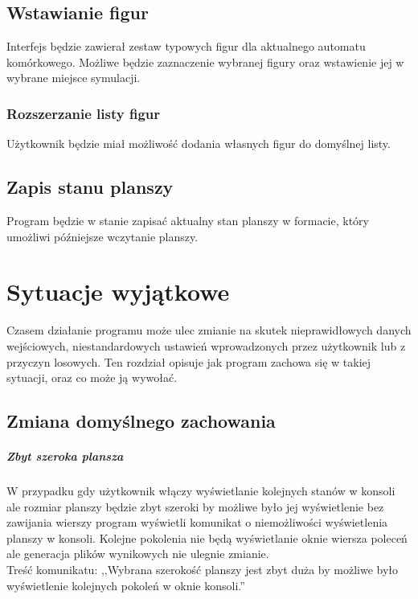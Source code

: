 \documentclass{report}
\begin{document}
\section{Wstawianie figur}
Interfejs będzie zawierał zestaw typowych figur dla aktualnego automatu komórkowego. Możliwe będzie zaznaczenie wybranej figury oraz wstawienie jej w wybrane miejsce symulacji.

\subsection{Rozszerzanie listy figur}
Użytkownik będzie miał możliwość dodania własnych figur do domyślnej listy.

\section{Zapis stanu planszy}
Program będzie w stanie zapisać aktualny stan planszy w formacie, który umożliwi późniejsze  wczytanie planszy.

\chapter{Sytuacje wyjątkowe}
Czasem działanie programu może ulec zmianie na skutek nieprawidłowych danych wejściowych, niestandardowych ustawień wprowadzonych przez użytkownik lub z przyczyn losowych. Ten rozdział opisuje jak program zachowa się w takiej sytuacji, oraz co może ją wywołać.

\section{Zmiana domyślnego zachowania}
\paragraph{Zbyt szeroka plansza}
W przypadku gdy użytkownik włączy wyświetlanie kolejnych stanów w konsoli ale rozmiar planszy będzie zbyt szeroki by możliwe było jej wyświetlenie bez zawijania wierszy program wyświetli komunikat o niemożliwości wyświetlenia planszy w konsoli. Kolejne pokolenia nie będą wyświetlanie oknie wiersza poleceń ale generacja plików wynikowych nie ulegnie zmianie. \\
Treść komunikatu: ,,Wybrana szerokość planszy jest zbyt duża by możliwe było wyświetlenie kolejnych pokoleń w oknie konsoli.''
\end{document}
